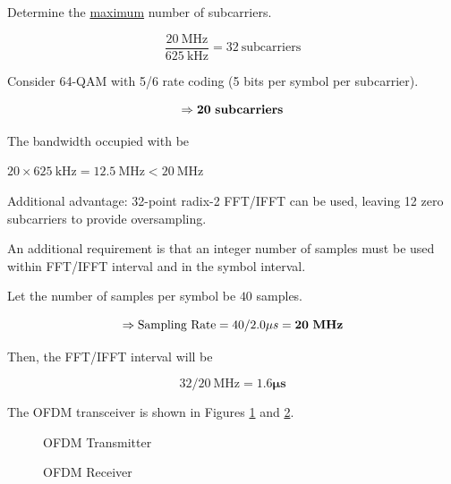 \documentclass[fleqn]{article}
\begin{document}
\begin{enumerate}
		Determine the \underline{maximum} number of subcarriers.
		
		\begin{equation*}
			\frac{20\ \text{MHz}}{625\ \text{kHz}} = 32\ \text{subcarriers}
		\end{equation*}
		
		Consider 64-QAM with 5/6 rate coding (5 bits per symbol per subcarrier).
		
		\begin{equation*}
			\Rightarrow \mathbf{20}\ \text{\textbf{subcarriers}}
		\end{equation*}
		
		The bandwidth occupied with be
		
		$20 \times 625\ \text{kHz} = 12.5\ \text{MHz} < 20\ \text{MHz}$
		
		Additional advantage: 32-point radix-2 FFT/IFFT can be used, leaving 12 zero subcarriers to provide oversampling.
		
		An additional requirement is that an integer number of samples must be used within FFT/IFFT interval and in the symbol interval.
		
		Let the number of samples per symbol be $40$ samples.
		
		\begin{equation*}
			\Rightarrow \text{Sampling Rate} = 40/2.0{\mu}s = \mathbf{20}\ \text{\textbf{MHz}}
		\end{equation*}
		
		Then, the FFT/IFFT interval will be
		
		\begin{equation*}
			32/20\ \text{MHz} = \mathbf{1.6 {\mu}s}
		\end{equation*}		
		
		The OFDM transceiver is shown in Figures \ref{fig::ofdm_tx_config} and \ref{fig::ofdm_rx_config}.
		
		\begin{figure}[H]
			\centerline{}
			\caption{OFDM Transmitter}
			\label{fig::ofdm_tx_config}
		\end{figure}
		
		\begin{figure}[H]
			\centerline{}
			\caption{OFDM Receiver}
			\label{fig::ofdm_rx_config}
		\end{figure}
		

\end{enumerate}
\end{document}
